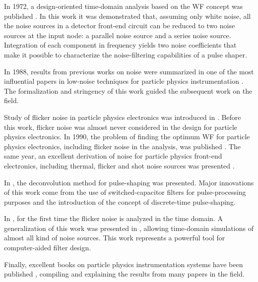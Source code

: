 In 1972, a design-oriented time-domain analysis based on the WF concept was published \citep{goulding101}. In this work it was demonstrated that, assuming only white noise, all the noise sources in a detector front-end circuit can be reduced to two noise sources at the input node: a parallel noise source and a series noise source. Integration of each component in frequency yields two noise coefficients that make it possible to characterize the noise-filtering capabilities of a pulse shaper.

In 1988, results from previous works on noise were summarized in one of the most influential papers in low-noise techniques for particle physics instrumentation \citep{radeka101}. The formalization and stringency of this work guided the subsequent work on the field.

Study of flicker noise in particle physics electronics was introduced in \citep{lutz101}. Before this work, flicker noise was almost never considered in the design for particle physics electronics. In 1990, the problem of finding the optimum WF for particle physics electronics, including flicker noise in the analysis, was published \citep{gatti104}. The same year, an excellent derivation of noise for particle physics front-end electronics, including thermal, flicker and shot noise sources was presented \citep{sansen101}.

In \citep{gadomski101}, the deconvolution method for pulse-shaping was presented. Major innovations of this work come from the use of switched-capacitor filters for \mbox{pulse-processing} purposes and the introduction of the concept of \mbox{discrete-time} \mbox{pulse-shaping}.

In \citep{pullia104}, for the first time the flicker noise is analyzed in the time domain. A generalization of this work was presented in \citep{pullia102}, allowing time-domain simulations of almost all kind of noise sources.  This work represents a powerful tool for computer-aided filter design.

Finally, excellent books on particle physics instrumentation systems have been published \citep{radeka201}, compiling and explaining the results from many papers in the field.



